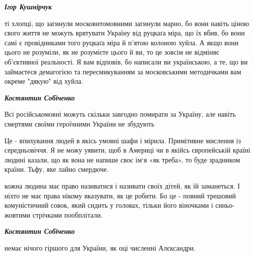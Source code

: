 \begin{center}
	\begin{fminipage}{0.9\textwidth}
\color{orange}\large

{\bfseries\em Ігор Кушнірчук}\par

ті хлопці, що загинули московитомовними загинули марно, бо вони навіть ціною
свого життя не можуть врятувати Україну від руцкаґа міра, що їх вбив, бо вони
самі є провідниками того руцкаґа міра й п'ятою колоною хуйла. А якщо вони цього
не розуміли, як не розумієте цього й ви, то це зовсім не відміняє об'єктивної
реальності. Я вам відповів, бо написали ви українською, а те, що ви займаєтеся
демагогією та пересмикуванням за московськими методичками вам окреме "дякую"
від хуйла.

{\bfseries\em Костянтин Собіченко}\par

Всі російськомовні можуть скільки завгодно помирати за Україну, але навіть
смертями своїми героїчними України не збудують


Це - впихування людей в якісь умовні шафи і мірила. Примітивне мислення із
середньовіччя. Я не можу уявити, щоб в Америці чи в якійсь європейській країні
людині казали, що як вона не напише своє ім‘я «як треба», то буде зрадником
країни. Тьфу, яке лайно смердюче.


кожна людина має право називатися і називати своїх дітей, як їй заманеться. І
ніхто не має права нікому вказувати, як це робити. Бо це - повний трешовий
комуністичний совок, який сидить у головах, тільки його віночками і
синьо-жовтими стрічками пообплітали.

{\bfseries\em Костянтин Собіченко}\par
немає нічого гіршого для України, як оці численні Алєксандри.

	\end{fminipage}
\end{center}

